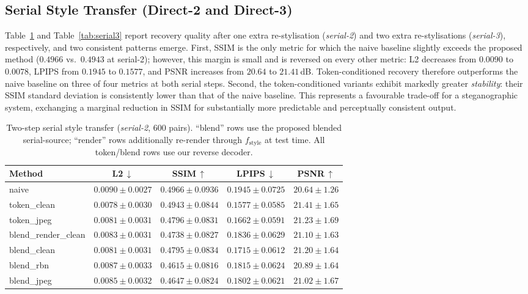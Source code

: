 \documentclass[runningheads]{llncs}
\begin{document}
\subsection{Serial Style Transfer (Direct-2 and Direct-3)}
\label{sec:exp_serial}
Table~\ref{tab:serial2} and Table~\ref{tab:serial3} report recovery quality after one extra re-stylisation (\emph{serial-2}) and two extra re-stylisations (\emph{serial-3}), respectively, and two consistent patterns emerge. First, SSIM is the only metric for which the naive baseline slightly exceeds the proposed method ($0.4966$ vs.\ $0.4943$ at serial-2); however, this margin is small and is reversed on every other metric: L2 decreases from $0.0090$ to $0.0078$, LPIPS from $0.1945$ to $0.1577$, and PSNR increases from $20.64$ to $21.41$\,dB. Token-conditioned recovery therefore outperforms the naive baseline on three of four metrics at both serial steps. Second, the token-conditioned variants exhibit markedly greater \emph{stability}: their SSIM standard deviation is consistently lower than that of the naive baseline. This represents a favourable trade-off for a steganographic system, exchanging a marginal reduction in SSIM for substantially more predictable and perceptually consistent output.

\begin{table}[t]
\centering
\caption{Two-step serial style transfer (\emph{serial-2}, $600$ pairs). ``blend'' rows use the proposed blended serial-source; ``render'' rows additionally re-render through $f_{\text{style}}$ at test time. All token/blend rows use our reverse decoder.}
\label{tab:serial2}
\setlength{\tabcolsep}{4pt}
\footnotesize
\begin{tabular}{lcccc}
\toprule
\textbf{Method} & \textbf{L2}\,$\downarrow$ & \textbf{SSIM}\,$\uparrow$ & \textbf{LPIPS}\,$\downarrow$ & \textbf{PSNR}\,$\uparrow$ \\
\midrule
naive                & $0.0090\pm0.0027$ & $0.4966\pm0.0936$ & $0.1945\pm0.0725$ & $20.64\pm1.26$ \\
\rowcolor{rowshade}
token\_clean          & $\mathbf{0.0078\pm0.0030}$ & $0.4943\pm0.0844$ & $\mathbf{0.1577\pm0.0585}$ & $\mathbf{21.41\pm1.65}$ \\
token\_jpeg           & $0.0081\pm0.0031$ & $0.4796\pm0.0831$ & $0.1662\pm0.0591$ & $21.23\pm1.69$ \\
\rowcolor{rowshade}
blend\_render\_clean  & $0.0083\pm0.0031$ & $0.4738\pm0.0827$ & $0.1836\pm0.0629$ & $21.10\pm1.63$ \\
blend\_clean          & $0.0081\pm0.0031$ & $0.4795\pm0.0834$ & $0.1715\pm0.0612$ & $21.20\pm1.64$ \\
\rowcolor{rowshade}
blend\_rbn            & $0.0087\pm0.0033$ & $0.4615\pm0.0816$ & $0.1815\pm0.0624$ & $20.89\pm1.64$ \\
blend\_jpeg           & $0.0085\pm0.0032$ & $0.4647\pm0.0824$ & $0.1802\pm0.0621$ & $21.02\pm1.67$ \\
\bottomrule
\end{tabular}
\end{table}
\end{document}
